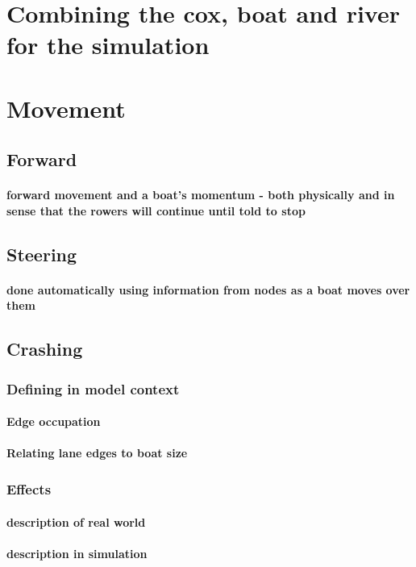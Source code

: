   \section{Combining the cox, boat and river for the simulation}
  
  \section{Movement}
    \subsection{Forward}
      \paragraph{forward movement and a boat's momentum - both physically and in sense that the rowers will continue until told to stop}
    \subsection{Steering}
      \paragraph{done automatically using information from nodes as a boat moves over them}
    \subsection{Crashing}\label{model:movement:crashing}
      \subsubsection{Defining in model context}
        \paragraph{Edge occupation}
        \paragraph{Relating lane edges to boat size}
      \subsubsection{Effects}
        \paragraph{description of real world}
        \paragraph{description in simulation}
